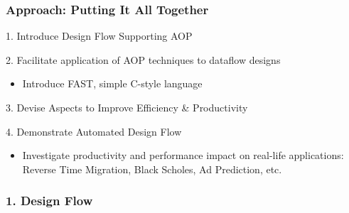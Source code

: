 \begin{frame}
  \frametitle{Approach: Putting It All Together}
  \begin{beamerboxesrounded}{1. Introduce Design Flow Supporting AOP}
  \end{beamerboxesrounded}
  \begin{beamerboxesrounded}{2. Facilitate application of AOP
      techniques to dataflow designs}
    \begin{itemize}
    \item Introduce FAST, simple C-style language
    \end{itemize}
  \end{beamerboxesrounded}

  \begin{beamerboxesrounded}{3. Devise Aspects to Improve Efficiency
      \& Productivity}
  \end{beamerboxesrounded}

  \begin{beamerboxesrounded}{4. Demonstrate Automated Design Flow}
    \begin{itemize}
    \item Investigate productivity and performance impact on real-life
      applications: Reverse Time Migration, Black Scholes, Ad
      Prediction, etc.
    \end{itemize}
  \end{beamerboxesrounded}
\end{frame}

\begin{frame}
  \frametitle{1. Design Flow}
  \vspace{-0.3cm}
  \begin{figure}
    \centering
    \def\svgwidth{0.88\textwidth}
    
  \end{figure}
\end{frame}